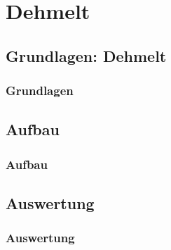 \section{Dehmelt}
\subsection{Grundlagen: Dehmelt}
\begin{frame}
\frametitle{Grundlagen}
  
\end{frame}

\subsection{Aufbau}
\begin{frame}
\frametitle{Aufbau}
  
\end{frame}

\subsection{Auswertung}
\begin{frame}
\frametitle{Auswertung}
  
\end{frame}